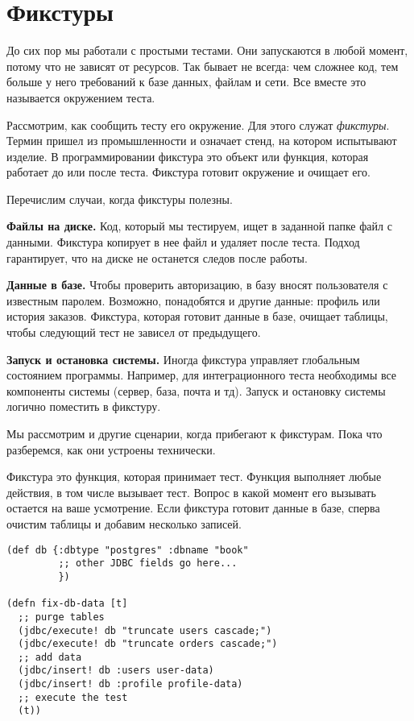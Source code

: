 \section{Фикстуры}

До сих пор мы работали с простыми тестами. Они запускаются в любой момент,
потому что не зависят от ресурсов. Так бывает не всегда: чем сложнее код, тем
больше у него требований к базе данных, файлам и сети. Все вместе это называется
окружением теста.

Рассмотрим, как сообщить тесту его окружение. Для этого служат
\emph{фикстуры}. Термин пришел из промышленности и означает стенд, на котором
испытывают изделие. В программировании фикстура это объект или функция, которая
работает до или после теста. Фикстура готовит окружение и очищает его.

Перечислим случаи, когда фикстуры полезны.

\textbf{Файлы на диске.} Код, который мы тестируем, ищет в заданной папке файл с
данными. Фикстура копирует в нее файл и удаляет после теста. Подход гарантирует,
что на диске не останется следов после работы.

\textbf{Данные в базе.} Чтобы проверить авторизацию, в базу вносят пользователя
с известным паролем. Возможно, понадобятся и другие данные: профиль или история
заказов. Фикстура, которая готовит данные в базе, очищает таблицы, чтобы
следующий тест не зависел от предыдущего.

\textbf{Запуск и остановка системы.} Иногда фикстура управляет глобальным
состоянием программы. Например, для интеграционного теста необходимы все
компоненты системы (сервер, база, почта и тд). Запуск и остановку системы
логично поместить в фикстуру.

Мы рассмотрим и другие сценарии, когда прибегают к фикстурам. Пока что
разберемся, как они устроены технически.

Фикстура это функция, которая принимает тест. Функция выполняет любые действия,
в том числе вызывает тест. Вопрос в какой момент его вызывать остается на ваше
усмотрение. Если фикстура готовит данные в базе, сперва очистим таблицы и
добавим несколько записей.

\begin{verbatim}
(def db {:dbtype "postgres" :dbname "book"
         ;; other JDBC fields go here...
         })

(defn fix-db-data [t]
  ;; purge tables
  (jdbc/execute! db "truncate users cascade;")
  (jdbc/execute! db "truncate orders cascade;")
  ;; add data
  (jdbc/insert! db :users user-data)
  (jdbc/insert! db :profile profile-data)
  ;; execute the test
  (t))
\end{verbatim}

